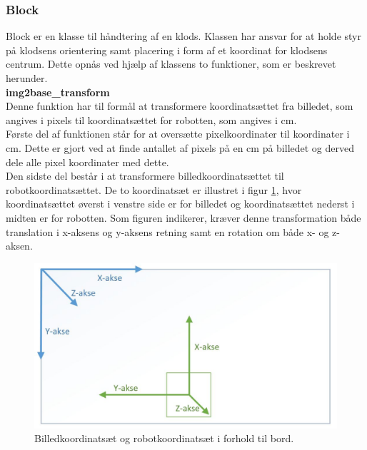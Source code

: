 \subsubsection{Block} %
\label{subsub:block}

Block er en klasse til håndtering af en klods. Klassen har ansvar for at holde styr på klodsens orientering samt placering i form af et koordinat for klodsens centrum. Dette opnås ved hjælp af klassens to funktioner, som er beskrevet herunder. \\

\textbf{img2base\_transform} \\
Denne funktion har til formål at transformere koordinatsættet fra billedet, som angives i pixels til koordinatsættet for robotten, som angives i cm.\\

Første del af funktionen står for at oversætte pixelkoordinater til koordinater i cm. Dette er gjort ved at finde antallet af pixels på en cm på billedet og derved dele alle pixel koordinater med dette. \\

Den sidste del består i at transformere billedkoordinatsættet til robotkoordinatsættet. De to koordinatsæt er illustret i figur \ref{fig:img2base}, hvor koordinatsættet øverst i venstre side er for billedet og koordinatsættet nederst i midten er for robotten. Som figuren indikerer, kræver denne transformation både translation i x-aksens og y-aksens retning samt en rotation om både x- og z-aksen. \\

\begin{figure}[H]
\centering
\includegraphics[scale=0.4]{images/img2base}
\caption{Billedkoordinatsæt og robotkoordinatsæt i forhold til bord.}
\label{fig:img2base}
\end{figure}

